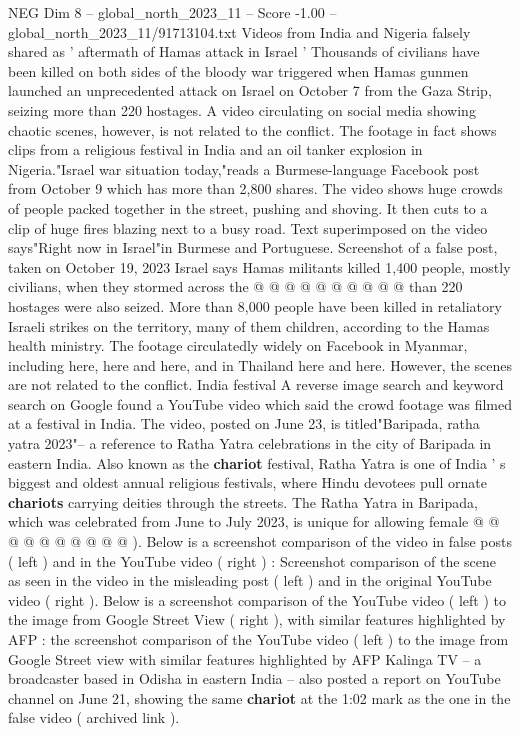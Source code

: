\begin{textsample}{NEG Dim 8 – global\_north\_2023\_11 – Score -1.00 – global\_north\_2023\_11/91713104.txt}  \label{ex:f8_neg_329}
Videos from India and Nigeria falsely shared as ' aftermath of Hamas attack in Israel ' Thousands of civilians have been killed on both sides of the bloody war triggered when Hamas gunmen launched an unprecedented attack on Israel on October 7 from the Gaza Strip, seizing more than 220 hostages.
A video circulating on social media showing chaotic scenes, however, is not related to the conflict.
The footage in fact shows clips from a religious festival in India and an oil tanker explosion in Nigeria."Israel war situation today,"reads a Burmese-language Facebook post from October 9 which has more than 2,800 shares.
The video shows huge crowds of people packed together in the street, pushing and shoving.
It then cuts to a clip of huge fires blazing next to a busy road.
Text superimposed on the video says"Right now in Israel"in Burmese and Portuguese.
Screenshot of a false post, taken on October 19, 2023 Israel says Hamas militants killed 1,400 people, mostly civilians, when they stormed across the @ @ @ @ @ @ @ @ @ @ than 220 hostages were also seized.
More than 8,000 people have been killed in retaliatory Israeli strikes on the territory, many of them children, according to the Hamas health ministry.
The footage circulatedly widely on Facebook in Myanmar, including here, here and here, and in Thailand here and here.
However, the scenes are not related to the conflict.
India festival A reverse image search and keyword search on Google found a YouTube video which said the crowd footage was filmed at a festival in India.
The video, posted on June 23, is titled"Baripada, ratha yatra 2023"-- a reference to Ratha Yatra celebrations in the city of Baripada in eastern India.
Also known as the \textbf{chariot} festival, Ratha Yatra is one of India ' s biggest and oldest annual religious festivals, where Hindu devotees pull ornate \textbf{chariots} carrying deities through the streets.
The Ratha Yatra in Baripada, which was celebrated from June to July 2023, is unique for allowing female @ @ @ @ @ @ @ @ @ @ ).
Below is a screenshot comparison of the video in false posts ( left ) and in the YouTube video ( right ) : Screenshot comparison of the scene as seen in the video in the misleading post ( left ) and in the original YouTube video ( right ).
Below is a screenshot comparison of the YouTube video ( left ) to the image from Google Street View ( right ), with similar features highlighted by AFP : the screenshot comparison of the YouTube video ( left ) to the image from Google Street view with similar features highlighted by AFP Kalinga TV -- a broadcaster based in Odisha in eastern India -- also posted a report on YouTube channel on June 21, showing the same \textbf{chariot} at the 1:02 mark as the one in the false video ( archived link ).

\end{textsample}
